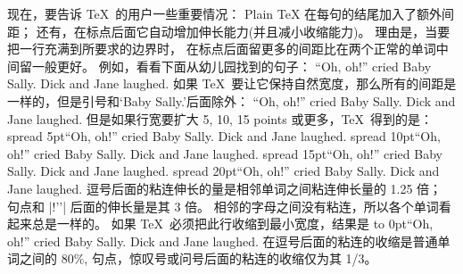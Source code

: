 现在，要告诉 \TeX\ 的用户一些重要情况：
Plain TeX 在每句的结尾加入了额外间距；
还有，在标点后面它自动增加伸长能力(并且减小收缩能力)。%
理由是，当要把一行充满到所要求的边界时，
在标点后面留更多的间距比在两个正常的单词中间留一般更好。%
例如，看看下面从幼儿园找到的句子：
\begintt
``Oh, oh!'' cried Baby Sally. Dick and Jane laughed.
\endtt
\1如果 \TeX\ 要让它保持自然宽度，那么所有的间距是一样的，但是引号和`Baby Sally.'后面除外：
\begindisplay
``Oh, oh!'' cried Baby Sally. Dick and Jane laughed.
\enddisplay
但是如果行宽要扩大 5, 10, 15 points 或更多，\TeX\ 得到的是：
\begindisplay
\hbox spread 5pt{``Oh, oh!'' cried Baby Sally. Dick and Jane laughed.}\cr
\hbox spread 10pt{``Oh, oh!'' cried Baby Sally. Dick and Jane laughed.}\cr
\hbox spread 15pt{``Oh, oh!'' cried Baby Sally. Dick and Jane laughed.}\cr
\hbox spread 20pt{``Oh, oh!'' cried Baby Sally. Dick and Jane laughed.}\cr
\enddisplay
逗号后面的粘连伸长的量是相邻单词之间粘连伸长量的 1.25 倍；
句点和 |!''| 后面的伸长量是其 3 倍。%
相邻的字母之间没有粘连，所以各个单词看起来总是一样的。%
如果 \TeX\ 必须把此行收缩到最小宽度，结果是
\begindisplay \hfuzz 1000pt
\hbox to 0pt{``Oh, oh!'' cried Baby Sally. Dick and Jane laughed.}
\enddisplay
在逗号后面的粘连的收缩是普通单词之间的 80\%,
句点，惊叹号或问号后面的粘连的收缩仅为其 1/3。

